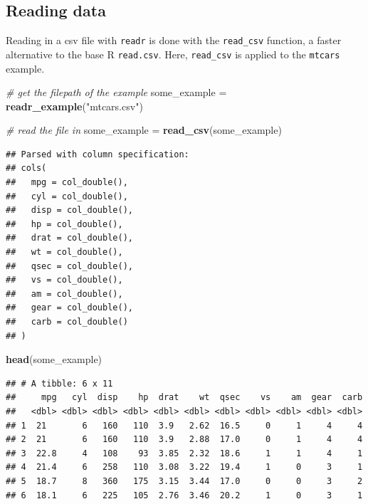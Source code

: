 \documentclass[]{book}
\newenvironment{Shaded}{}{}
\newcommand{\CommentTok}[1]{\textcolor[rgb]{0.38,0.63,0.69}{\textit{#1}}}
\newcommand{\KeywordTok}[1]{\textcolor[rgb]{0.00,0.44,0.13}{\textbf{#1}}}
\newcommand{\NormalTok}[1]{#1}
\newcommand{\StringTok}[1]{\textcolor[rgb]{0.25,0.44,0.63}{#1}}
\begin{document}
\hypertarget{reading-data}{%
\subsection{Reading data}\label{reading-data}}

Reading in a csv file with \texttt{readr} is done with the \texttt{read\_csv} function, a faster alternative to the base R \texttt{read.csv}. Here, \texttt{read\_csv} is applied to the \texttt{mtcars} example.

\begin{Shaded}
\begin{Highlighting}[]
\CommentTok{# get the filepath of the example}
\NormalTok{some_example =}\StringTok{ }\KeywordTok{readr_example}\NormalTok{(}\StringTok{"mtcars.csv"}\NormalTok{)}

\CommentTok{# read the file in}
\NormalTok{some_example =}\StringTok{ }\KeywordTok{read_csv}\NormalTok{(some_example)}
\end{Highlighting}
\end{Shaded}

\begin{verbatim}
## Parsed with column specification:
## cols(
##   mpg = col_double(),
##   cyl = col_double(),
##   disp = col_double(),
##   hp = col_double(),
##   drat = col_double(),
##   wt = col_double(),
##   qsec = col_double(),
##   vs = col_double(),
##   am = col_double(),
##   gear = col_double(),
##   carb = col_double()
## )
\end{verbatim}

\begin{Shaded}
\begin{Highlighting}[]
\KeywordTok{head}\NormalTok{(some_example)}
\end{Highlighting}
\end{Shaded}

\begin{verbatim}
## # A tibble: 6 x 11
##     mpg   cyl  disp    hp  drat    wt  qsec    vs    am  gear  carb
##   <dbl> <dbl> <dbl> <dbl> <dbl> <dbl> <dbl> <dbl> <dbl> <dbl> <dbl>
## 1  21       6   160   110  3.9   2.62  16.5     0     1     4     4
## 2  21       6   160   110  3.9   2.88  17.0     0     1     4     4
## 3  22.8     4   108    93  3.85  2.32  18.6     1     1     4     1
## 4  21.4     6   258   110  3.08  3.22  19.4     1     0     3     1
## 5  18.7     8   360   175  3.15  3.44  17.0     0     0     3     2
## 6  18.1     6   225   105  2.76  3.46  20.2     1     0     3     1
\end{verbatim}
\end{document}
